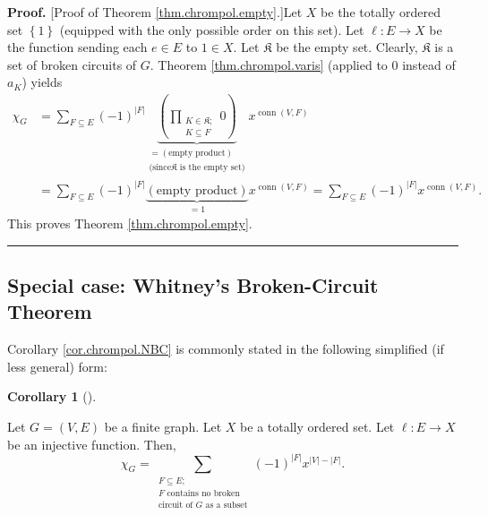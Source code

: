 \documentclass[numbers=enddot,12pt,final,onecolumn,notitlepage]{scrartcl}%
\theoremstyle{definition}
\newtheorem{coro}[theo]{Corollary}
\newenvironment{corollary}[1][]
{\begin{coro}[#1]\begin{leftbar}}
{\end{leftbar}\end{coro}}
\newenvironment{proof}[1][Proof]{\noindent\textbf{#1.} }{\ \rule{0.5em}{0.5em}}
\newenvironment{verlong}{}{}
\let\sumnonlimits\sum
\let\prodnonlimits\prod
\renewcommand{\sum}{\sumnonlimits\limits}
\renewcommand{\prod}{\prodnonlimits\limits}
\begin{document}
\begin{verlong}
\begin{proof}
[Proof of Theorem \ref{thm.chrompol.empty}.]Let $X$ be the totally ordered set
$\left\{  1\right\}  $ (equipped with the only possible order on this set).
Let $\ell:E\rightarrow X$ be the function sending each $e\in E$ to $1\in X$.
Let $\mathfrak{K}$ be the empty set. Clearly, $\mathfrak{K}$ is a set of
broken circuits of $G$. Theorem \ref{thm.chrompol.varis} (applied to $0$
instead of $a_{K}$) yields%
\begin{align*}
\chi_{G}  &  =\sum_{F\subseteq E}\left(  -1\right)  ^{\left\vert F\right\vert
}\underbrace{\left(  \prod_{\substack{K\in\mathfrak{K};\\K\subseteq
F}}0\right)  }_{\substack{=\left(  \text{empty product}\right)  \\\text{(since
}\mathfrak{K}\text{ is the empty set)}}}x^{\operatorname*{conn}\left(
V,F\right)  }\\
&  =\sum_{F\subseteq E}\left(  -1\right)  ^{\left\vert F\right\vert
}\underbrace{\left(  \text{empty product}\right)  }_{=1}%
x^{\operatorname*{conn}\left(  V,F\right)  }=\sum_{F\subseteq E}\left(
-1\right)  ^{\left\vert F\right\vert }x^{\operatorname*{conn}\left(
V,F\right)  }.
\end{align*}
This proves Theorem \ref{thm.chrompol.empty}.
\end{proof}
\end{verlong}

\subsection{Special case: Whitney's Broken-Circuit Theorem}

Corollary \ref{cor.chrompol.NBC} is commonly stated in the following
simplified (if less general) form:

\Needspace{4cm}

\begin{corollary}
\label{cor.chrompol.NBCfor}Let $G=\left(  V,E\right)  $ be a finite graph. Let
$X$ be a totally ordered set. Let $\ell:E\rightarrow X$ be an injective
function. Then,%
\[
\chi_{G}=\sum_{\substack{F\subseteq E;\\F\text{ contains no broken}%
\\\text{circuit of }G\text{ as a subset}}}\left(  -1\right)  ^{\left\vert
F\right\vert }x^{\left\vert V\right\vert -\left\vert F\right\vert }.
\]

\end{corollary}
\end{document}
